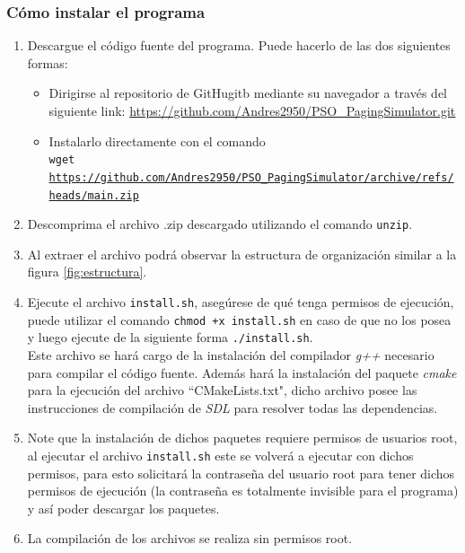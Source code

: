 \documentclass{report}
\begin{document}
\subsubsection{Cómo instalar el programa}
\begin{enumerate}
  \item Descargue el código fuente del programa. Puede hacerlo de las dos siguientes formas:
    \begin{itemize}
      \item Dirigirse al repositorio de GitHugitb mediante su navegador a través del siguiente link: \url{https://github.com/Andres2950/PSO\_PagingSimulator.git}
      \item Instalarlo directamente con el comando \\
    \texttt{wget \url{https://github.com/Andres2950/PSO\_PagingSimulator/archive/refs/heads/main.zip}}
    \end{itemize}
  \item Descomprima el archivo .zip descargado utilizando el comando \texttt{unzip}.
  \item Al extraer el archivo podrá observar la estructura de organización similar a la figura \ref{fig:estructura}.
\item Ejecute el archivo \texttt{install.sh}, asegúrese de qué tenga permisos de ejecución, puede utilizar el comando \texttt{chmod +x install.sh} en caso de que no los posea y luego ejecute de la siguiente forma \texttt{./install.sh}. \\
  Este archivo se hará cargo de la instalación del compilador \textit{g++} necesario para compilar el código fuente. Además hará la instalación del paquete \textit{cmake} para la ejecución del archivo ``CMakeLists.txt", dicho archivo posee las instrucciones de compilación de \textit{SDL} para resolver todas las dependencias. 
\item Note que la instalación de dichos paquetes requiere permisos de usuarios root, al ejecutar el archivo \texttt{install.sh} este se volverá a ejecutar con dichos permisos, para esto solicitará la contraseña del usuario root para tener dichos permisos de ejecución (la contraseña es totalmente invisible para el programa) y así poder descargar los paquetes.
\item La compilación de los archivos se realiza sin permisos root.

\end{enumerate}
\end{document}
